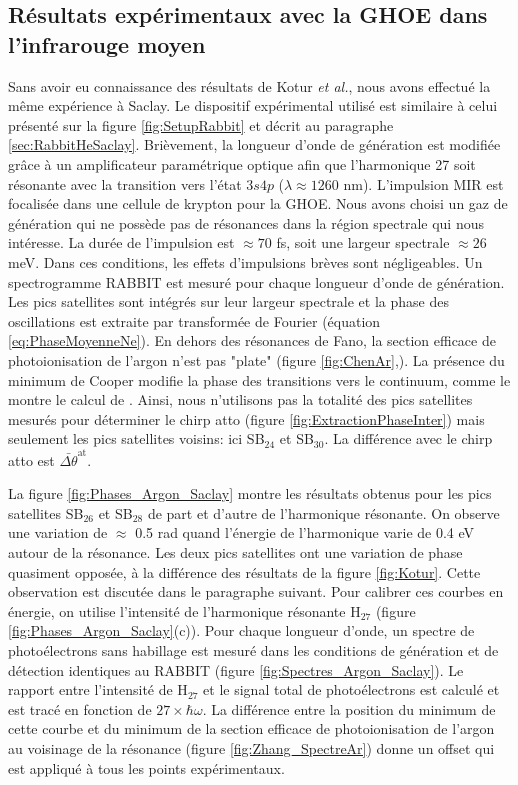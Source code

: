 \subsection{Résultats expérimentaux avec la GHOE dans l'infrarouge moyen}
Sans avoir eu connaissance des résultats de Kotur \textit{et al.}, nous avons effectué la même expérience à Saclay. Le dispositif expérimental utilisé est similaire à celui présenté sur la figure \ref{fig:SetupRabbit} et décrit au paragraphe \ref{sec:RabbitHeSaclay}. Brièvement, la longueur d'onde de génération est modifiée grâce à un amplificateur paramétrique optique afin que l'harmonique 27 soit résonante avec la transition vers l'état $3s4p$ ($\lambda \approx 1260$ nm). L'impulsion MIR est focalisée dans une cellule de krypton pour la GHOE. Nous avons choisi un gaz de génération qui ne possède pas de résonances dans la région spectrale qui nous intéresse.  La durée de l'impulsion est $\approx 70$ fs, soit une largeur spectrale $\approx 26$ meV. Dans ces conditions, les effets d'impulsions brèves sont négligeables. Un spectrogramme RABBIT est mesuré pour chaque longueur d'onde de génération. Les pics satellites sont intégrés sur leur largeur spectrale et la phase des oscillations est extraite par transformée de Fourier (équation \ref{eq:PhaseMoyenneNe}). En dehors des résonances de Fano, la section efficace de photoionisation de l'argon n'est pas "plate" (figure \ref{fig:ChenAr},). La présence du minimum de Cooper  modifie la phase des transitions vers le continuum, comme le montre le calcul de . Ainsi, nous n'utilisons pas la totalité des pics satellites mesurés pour déterminer le chirp atto (figure \ref{fig:ExtractionPhaseInter}) mais seulement les pics satellites voisins: ici SB$_{24}$ et SB$_{30}$. La différence avec le chirp atto est $\bar{\Delta \theta}^{\text{at}}$.

La figure \ref{fig:Phases_Argon_Saclay} montre les résultats obtenus pour les pics satellites SB$_{26}$ et SB$_{28}$ de part et d'autre de l'harmonique résonante. On observe une variation de $\approx$ 0.5 rad quand l'énergie de l'harmonique varie de 0.4 eV autour de la résonance. Les deux pics satellites ont une variation de phase quasiment opposée, à la différence des résultats de la figure \ref{fig:Kotur}. Cette observation est discutée dans le paragraphe suivant. Pour calibrer ces courbes en énergie, on utilise l'intensité de l'harmonique résonante H$_{27}$ (figure \ref{fig:Phases_Argon_Saclay}(c)). Pour chaque longueur d'onde, un spectre de photoélectrons sans habillage est mesuré dans les conditions de génération et de détection identiques au RABBIT (figure \ref{fig:Spectres_Argon_Saclay}). Le rapport entre l'intensité de H$_{27}$ et le signal total de photoélectrons est calculé et est tracé en fonction de $27 \times \hbar \omega$. La différence entre la position du minimum de cette courbe et du minimum de la section efficace de photoionisation de l'argon au voisinage de la résonance (figure \ref{fig:Zhang_SpectreAr}) donne un offset qui est appliqué à tous les points expérimentaux.

